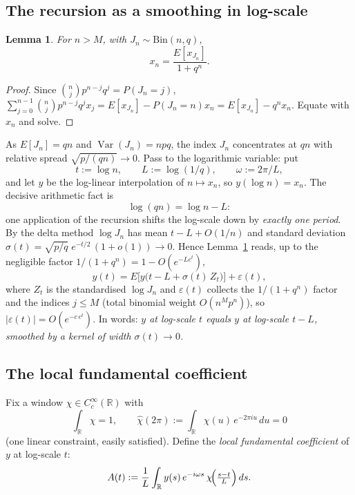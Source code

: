 \documentclass[11pt]{article}
\newtheorem{lemma}[theorem]{Lemma}
\theoremstyle{definition}
\begin{document}
\subsection{The recursion as a smoothing in log-scale}

\begin{lemma}\label{lem:smooth}
  For $n>M$, with $J_n\sim\mathrm{Bin}(n,q)$,
  \[
    x_n=\frac{E[x_{J_n}]}{1+q^n}.
  \]
\end{lemma}

\begin{proof}
  Since $\binom nj p^{n-j}q^j=P(J_n=j)$,
  $\sum_{j=0}^{n-1}\binom nj p^{n-j}q^j x_j=E[x_{J_n}]-P(J_n=n)x_n
   =E[x_{J_n}]-q^nx_n$. Equate with $x_n$ and solve.
\end{proof}

As $E[J_n]=qn$ and $\operatorname{Var}(J_n)=npq$, the index $J_n$
concentrates at $qn$ with relative spread $\sqrt{p/(qn)}\to0$. Pass to
the logarithmic variable: put
\[
  t:=\log n,\qquad L:=\log(1/q),\qquad \omega:=2\pi/L,
\]
and let $y$ be the log-linear interpolation of $n\mapsto x_n$, so
$y(\log n)=x_n$. The decisive arithmetic fact is
\[
  \log(qn)=\log n-L:
\]
one application of the recursion shifts the log-scale down by
\emph{exactly one period}. By the delta method $\log J_n$ has mean
$t-L+O(1/n)$ and standard deviation
$\sigma(t)=\sqrt{p/q}\;e^{-t/2}\,(1+o(1))\to0$. Hence
Lemma~\ref{lem:smooth} reads, up to the negligible factor
$1/(1+q^n)=1-O(e^{-Le^{t}})$,
\begin{equation}\label{eq:ysmooth}
  y(t)=E\bigl[y\bigl(t-L+\sigma(t)\,Z_t\bigr)\bigr]+\varepsilon(t),
\end{equation}
where $Z_t$ is the standardised $\log J_n$ and $\varepsilon(t)$
collects the $1/(1+q^n)$ factor and the indices $j\le M$ (total
binomial weight $O(n^Mp^n)$), so $|\varepsilon(t)|=O(e^{-c\,e^{t}})$.
In words: \emph{$y$ at log-scale $t$ equals $y$ at log-scale $t-L$,
smoothed by a kernel of width $\sigma(t)\to0$.}

\subsection{The local fundamental coefficient}

Fix a window $\chi\in C_c^\infty(\mathbb R)$ with
\[
  \int_{\mathbb R}\chi=1,\qquad
  \hat\chi(2\pi):=\int_{\mathbb R}\chi(u)\,e^{-2\pi i u}\,du=0
\]
(one linear constraint, easily satisfied). Define the \emph{local
fundamental coefficient} of $y$ at log-scale $t$:
\begin{equation}\label{eq:Adef}
  A(t):=\frac1L\int_{\mathbb R} y(s)\,e^{-i\omega s}\,
        \chi\!\Bigl(\tfrac{s-t}{L}\Bigr)\,ds .
\end{equation}
\end{document}
